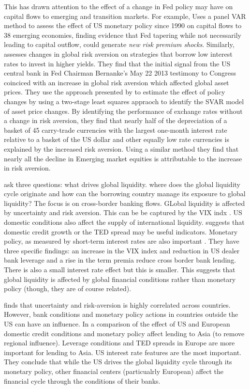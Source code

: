 \documentclass[12pt, a4paper, oneside]{article} %
\begin{document}
This has drawn attention to the effect of a change in Fed policy may have on capital flows to emerging and transition markets.  For example, \citet{IMFLatam}  Uses a panel VAR method to assess the effect of US monetary policy since 1990 on capital flows to 38 emerging economies, finding evidence that Fed tapering while not necessarily leading to capital outflow, could generate \emph{new risk premium shocks}.   Similarly, \citet{NYFedtaper} assesses changes in global risk aversion on strategies that borrow low interest rates to invest in higher yields.  They find that the initial signal from the US central bank in Fed Chairman Bernanke's May 22 2013 testimony to Congress coinciced with an increase in global risk aversion which affected global asset prices. They use the approach presented by \citet{MertensSVAR} to estimate the effect of policy changes by using a two-stage least squares appraoch to identify the SVAR model of asset price changes.  By identifying the performance of exchange rates without a change in risk aversion, they find that nearly half of the depreciation of a basket of 45 carry-trade currencies with the largest one-month interest rate relative to a basket of the US dollar and other equally low rate currencies is explained by the increased risk aversion. Using a similar method they find that nearly all the decline in Emerging market equities is attributable to the increase in risk aversion.

\citet{Cerutti2014} ask three questions:  what drives global liquidity. where does the global liquidity cycle originate and how can the borrowing country manage its exposure to global liquidity? The focus is on cross-border banking flows. GLobal liquidity is affected by uncertainty and risk aversion.  This can be be captured by the VIX indx \citet{Rey2013}. US domestic conditions also affect the supply of international liquidity.  \citet{Bruno2014} suggests that domestic credit growth or the TED spread may be useful indicators. Monetary policy, as measured by short-term interest rates are also important \citet{Cerutti2014}. They have three specific findings:  an increase in the VIX index and reduction in US dealer bank leverage and a rise in the term premia reduce cross border bank lending.  There is also a small interest rate effect but this is smaller.  This suggests that global liquidity is affected by global financial conditions rather than monetary policy (though, they are of course related). 

\citet{Cerutti2014} finds that uncertainty and risk-aversion is highly correlated across countries. However, bank conditions and monetary policy actions in countries outside the US can have an influence. In a comparison of the effect of US and European domestic credit conditions and monetary policy affect lending to Asia (to remove regional influence).  Leverage conditions and TED spreads in Europe are more important for lending to Asia.  US interest rate features are the most important. They conclude that while the US drives the global liquidity cycle through its monetary policy, other financial centers (particualrly European) affect the financial cycle through the conditions of their banks. 
\end{document}
